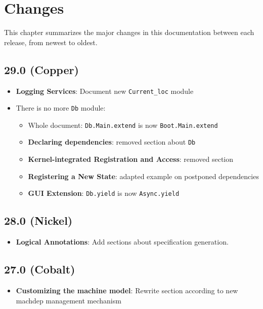
\chapter{Changes}\label{chap:changes}

This chapter summarizes the major changes in this documentation between each
\framac release, from newest to oldest.


\section*{29.0 (Copper)}
\begin{itemize}
\item \textbf{Logging Services}: Document new \texttt{Current\_loc} module
\item There is no more \texttt{Db} module:
  \begin{itemize}
  \item Whole document: \texttt{Db.Main.extend} is now \texttt{Boot.Main.extend}
  \item \textbf{Declaring dependencies}: removed section about \texttt{Db}
  \item \textbf{Kernel-integrated Registration and Access}: removed section
  \item \textbf{Registering a New State}: adapted example on postponed dependencies
  \item \textbf{GUI Extension}: \texttt{Db.yield} is now \texttt{Async.yield}
  \end{itemize}
\end{itemize}

\section*{28.0 (Nickel)}
\begin{itemize}
\item \textbf{Logical Annotations}: Add sections about specification generation.
\end{itemize}

\section*{27.0 (Cobalt)}
\begin{itemize}
\item \textbf{Customizing the machine model}: Rewrite section according to new
  machdep management mechanism
\end{itemize}

